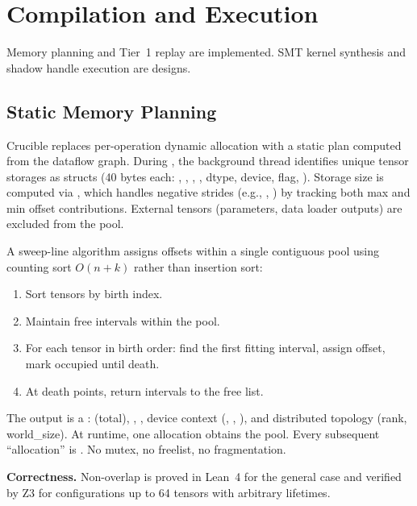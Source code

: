 
\section{Compilation and Execution}\label{sec:compilation}

Memory planning and Tier~1 replay are implemented.
SMT kernel synthesis and shadow handle execution are designs.

\subsection{Static Memory Planning}

Crucible replaces per-operation dynamic allocation with a static plan computed from the dataflow graph.
During , the background thread identifies unique tensor storages as  structs (40 bytes each: , , , , dtype, device,  flag, ).
Storage size is computed via , which handles negative strides (e.g., , ) by tracking both max and min offset contributions.
External tensors (parameters, data loader outputs) are excluded from the pool.

A sweep-line algorithm assigns offsets within a single contiguous pool using counting sort $O(n{+}k)$ rather than insertion sort:

\begin{enumerate}
  \item Sort tensors by birth index.
  \item Maintain free intervals within the pool.
  \item For each tensor in birth order: find the first fitting interval, assign offset, mark occupied until death.
  \item At death points, return intervals to the free list.
\end{enumerate}

The output is a :  (total), , , device context (, , ), and distributed topology (rank, world\_size).
At runtime, one allocation obtains the pool.
Every subsequent ``allocation'' is .
No mutex, no freelist, no fragmentation.

\textbf{Correctness.}
Non-overlap is proved in Lean~4 for the general case and verified by Z3 for configurations up to 64 tensors with arbitrary lifetimes.

